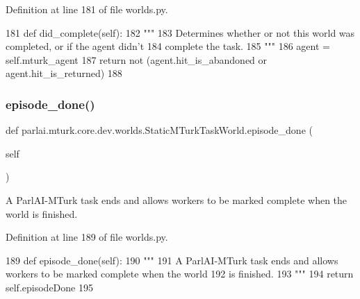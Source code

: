 Definition at line 181 of file worlds.\+py.


\begin{DoxyCode}
181     \textcolor{keyword}{def }did\_complete(self):
182         \textcolor{stringliteral}{"""}
183 \textcolor{stringliteral}{        Determines whether or not this world was completed, or if the agent didn't}
184 \textcolor{stringliteral}{        complete the task.}
185 \textcolor{stringliteral}{        """}
186         agent = self.mturk\_agent
187         \textcolor{keywordflow}{return} \textcolor{keywordflow}{not} (agent.hit\_is\_abandoned \textcolor{keywordflow}{or} agent.hit\_is\_returned)
188 
\end{DoxyCode}
\mbox{\label{classparlai_1_1mturk_1_1core_1_1dev_1_1worlds_1_1StaticMTurkTaskWorld_af6460dcb2a232ba0bd7ebfe8d386f5b6}} 
\subsubsection{\texorpdfstring{episode\+\_\+done()}{episode\_done()}}
{\footnotesize\ttfamily def parlai.\+mturk.\+core.\+dev.\+worlds.\+Static\+M\+Turk\+Task\+World.\+episode\+\_\+done (\begin{DoxyParamCaption}\item[{}]{self }\end{DoxyParamCaption})}

\begin{DoxyVerb}A ParlAI-MTurk task ends and allows workers to be marked complete when the world
is finished.
\end{DoxyVerb}
 

Definition at line 189 of file worlds.\+py.


\begin{DoxyCode}
189     \textcolor{keyword}{def }episode\_done(self):
190         \textcolor{stringliteral}{"""}
191 \textcolor{stringliteral}{        A ParlAI-MTurk task ends and allows workers to be marked complete when the world}
192 \textcolor{stringliteral}{        is finished.}
193 \textcolor{stringliteral}{        """}
194         \textcolor{keywordflow}{return} self.episodeDone
195 
\end{DoxyCode}
\mbox{\label{classparlai_1_1mturk_1_1core_1_1dev_1_1worlds_1_1StaticMTurkTaskWorld_a59a7b6fb3eea25c079ac36006311e1a0}} 
